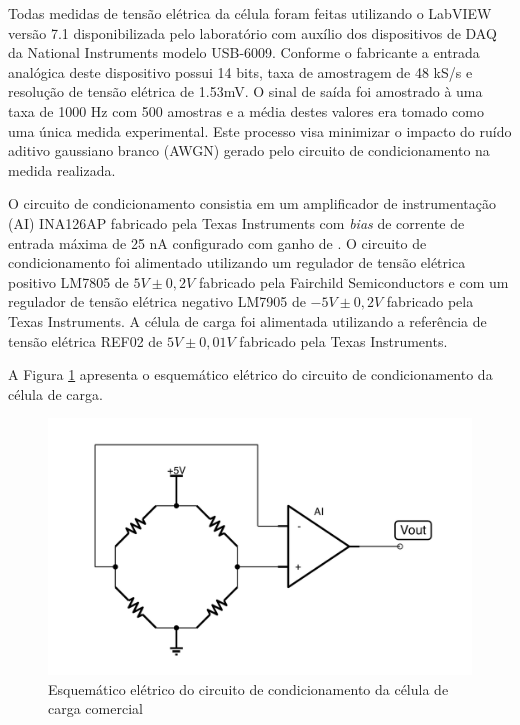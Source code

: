 \documentclass[a4paper]{instrumentacao}
\begin{document}
Todas medidas de tensão elétrica da célula foram feitas utilizando o LabVIEW versão 7.1 disponibilizada pelo laboratório com auxílio dos dispositivos de DAQ da National Instruments modelo USB-6009. Conforme o fabricante \cite{daq-specifications} a entrada analógica deste dispositivo possui 14 bits, taxa de amostragem de 48 kS/s e resolução de tensão elétrica de 1.53mV. O sinal de saída foi amostrado à uma taxa de 1000 Hz com 500 amostras e a média destes valores era tomado como uma única medida experimental. Este processo visa minimizar o impacto do ruído aditivo gaussiano branco (AWGN) gerado pelo circuito de condicionamento na medida realizada.

O circuito de condicionamento consistia em um amplificador de instrumentação (AI) INA126AP fabricado pela Texas Instruments com \textit{bias} de corrente de entrada máxima de 25 nA \cite{datasheet-ina126} configurado com ganho de . O circuito de condicionamento foi alimentado utilizando um regulador de tensão elétrica positivo LM7805 de $5V \pm 0,2V$ \cite{datasheet-lm7805} fabricado pela Fairchild Semiconductors e com um regulador de tensão elétrica negativo LM7905 de $-5V \pm 0,2V$ \cite{datasheet-lm7905} fabricado pela Texas Instruments. A célula de carga foi alimentada utilizando a referência de tensão elétrica REF02 de $5V \pm 0,01V$ \cite{datasheet-ref02} fabricado pela Texas Instruments.

A Figura \ref{fig:celula-comercial-metodologia-condicionamento} apresenta o esquemático elétrico do circuito de condicionamento da célula de carga.

\begin{figure}[H]
\center
\includegraphics[width=\textwidth]{Comercial-Circuito.pdf}
\caption{Esquemático elétrico do circuito de condicionamento da célula de carga comercial}
\label{fig:celula-comercial-metodologia-condicionamento}
\end{figure}
\end{document}
